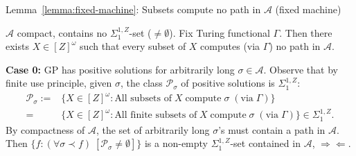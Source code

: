 \begin{frame}{Lemma~\ref{lemma:fixed-machine}: Subsets compute no path in
$\mathcal{A}$ (fixed machine)}
  \begin{lemma}
    \label{lemma:fixed-machine}
    $\mathcal{A}$ compact, contains no $\Sigma_1^{1,Z}$-set
    ($\neq\emptyset$). Fix Turing functional $\Gamma$. Then there exists
    $X\in[Z]^\omega$ such that every subset of $X$ computes (via $\Gamma$)
    no path in $\mathcal{A}$.


  \end{lemma}

  \vspace{0.5em}
  \textbf{Case 0:} GP has positive solutions for arbitrarily long
  $\sigma\in\mathcal{A}$. Observe that by finite use principle, given
  $\sigma$, the class $\mathcal{P}_{\sigma}$ of positive solutions is
  $\Sigma_1^{1,Z}$:
  \begin{align*}
    \mathcal{P}_{\sigma}:= &\{X\in[Z]^\omega: \text{All subsets of}\; X\;
      \text{compute}\; \sigma\; (\text{via}\; \Gamma)\}\\
    =&\{X\in[Z]^\omega: \text{All finite subsets of}\; X\;
      \text{compute}\; \sigma\; (\text{via}\; \Gamma)\}
      \in\Sigma_1^{1,Z}.
  \end{align*}
  By compactness of $\mathcal{A}$, the set of arbitrarily long $\sigma$'s
  must contain a path in $\mathcal{A}$. Then $\{f:(\forall \sigma\prec f)\;
  [\mathcal{P}_\sigma \neq \emptyset]\}$ is a non-empty
  $\Sigma_1^{1,Z}$-set contained in $\mathcal{A}$, $\Rightarrow\Leftarrow$.
\end{frame}

